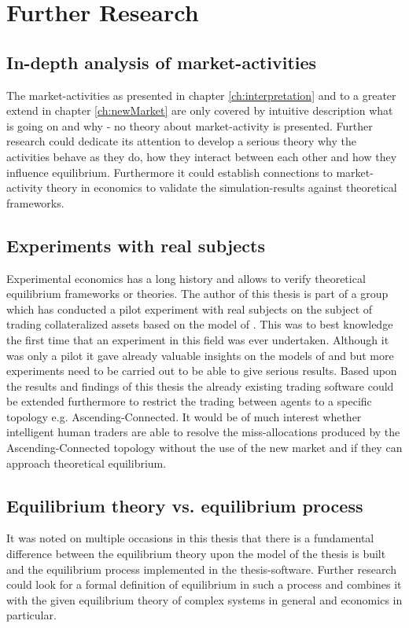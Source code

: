 \documentclass[Bachelorarbeit.tex]{subfiles}
\begin{document}
\section{Further Research}

\subsection{In-depth analysis of market-activities}
The market-activities as presented in chapter \ref{ch:interpretation} and to a greater extend in chapter \ref{ch:newMarket} are only covered by intuitive description what is going on and why - no theory about market-activity is presented. Further research could dedicate its attention to develop a serious theory why the activities behave as they do, how they interact between each other and how they influence equilibrium. Furthermore it could establish connections to market-activity theory in economics to validate the simulation-results against theoretical frameworks.

\subsection{Experiments with real subjects}
Experimental economics has a long history and allows to verify theoretical equilibrium frameworks or theories. The author of this thesis is part of a group which has conducted a pilot experiment with real subjects on the subject of trading collateralized assets based on the model of \cite{Breuer2015}. This was to best knowledge the first time that an experiment in this field was ever undertaken. Although it was only a pilot it gave already valuable insights on the models of \cite{Breuer2015} and \cite{Geanakoplos2009} but more experiments need to be carried out to be able to give serious results. Based upon the results and findings of this thesis the already existing trading software could be extended furthermore to restrict the trading between agents to a specific topology e.g. Ascending-Connected. It would be of much interest whether intelligent human traders are able to resolve the miss-allocations produced by the Ascending-Connected topology without the use of the new market and if they can approach theoretical equilibrium.

\subsection{Equilibrium theory vs. equilibrium process}
It was noted on multiple occasions in this thesis that there is a fundamental difference between the equilibrium theory upon the model of the thesis is built and the equilibrium process implemented in the thesis-software. Further research could look for a formal definition of equilibrium in such a process and combines it with the given equilibrium theory of complex systems in general and economics in particular.
\end{document}
